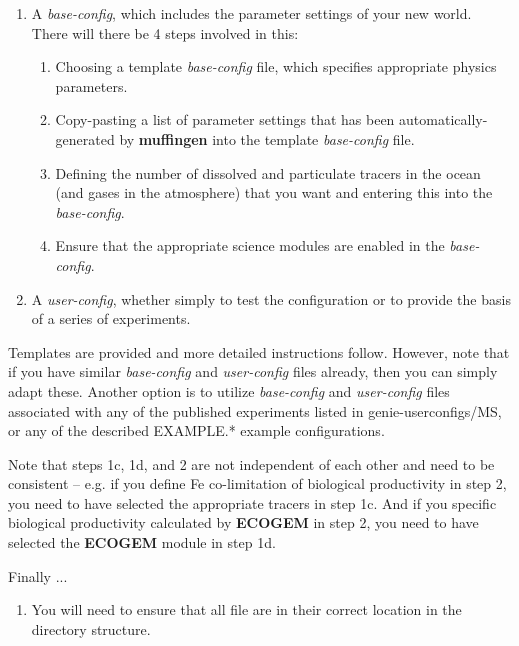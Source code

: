 \documentclass[11pt,fleqn]{book} %
\begin{document}
\begin{enumerate}[noitemsep]
\vspace{1mm}
\item A \textit{base-config}, which includes the parameter settings of your new world.
\\There will there be 4 steps involved in this:
\begin{enumerate}[noitemsep]
\item Choosing a template \textit{base-config} file, which specifies appropriate physics parameters.
\item Copy-pasting a list of parameter settings that has been automatically-generated by \textbf{muffingen} into the template\textit{ base-config} file.
\item Defining the number of dissolved and particulate tracers in the ocean (and gases in the atmosphere) that you want and entering this into the \textit{base-config}.
\item Ensure that the appropriate science modules are enabled in the \textit{base-config}.
\end{enumerate}
\vspace{1mm}
\item A \textit{user-config}, whether simply to test the configuration or to provide the basis of a series of experiments.
\end{enumerate}
\vspace{1mm}

Templates are provided and more detailed instructions follow. However, note that if you have similar \textit{base-config} and \textit{user-config} files already, then you can simply adapt these. Another option is to utilize \textit{base-config} and \textit{user-config} files associated with any of the published experiments listed in \textsf{\footnotesize genie-userconfigs/MS}, or any of the described \textsf{\footnotesize EXAMPLE.*} example configurations.

Note that steps 1c, 1d, and 2 are not independent of each other and need to be consistent -- e.g. if you define Fe co-limitation of biological productivity in step 2, you need to have selected the appropriate tracers in step 1c. And if you specific biological productivity calculated by \textbf{ECOGEM} in step 2, you need to have selected the \textbf{ECOGEM} module in step 1d.

Finally ... 
\begin{enumerate}[noitemsep]
\vspace{1mm}
\setcounter{enumi}{2}
\item You will need to ensure that all file are in their correct location in the directory structure.
\end{enumerate}
\vspace{1mm}
\end{document}
